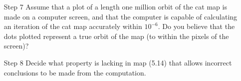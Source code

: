 \documentclass[12pt,letterpaper,reqno]{amsart}
\begin{document}
\begin{enumerate}
\begin{enumerate}
\begin{flushleft}
    \end{flushleft}
    
    \item[Step 7] Assume that a plot of a length one million orbit of the cat map is made on a computer screen, and that the computer is capable of calculating an iteration of the cat map accurately within $10^{-6}$. Do you believe that the dots plotted represent a true orbit of the map (to within the pixels of the screen)?
    \begin{flushleft}
    
    \end{flushleft}
    
    \item[Step 8] Decide what property is lacking in map (5.14) that allows incorrect conclusions to be made from the computation.
    \begin{flushleft}
    
    \end{flushleft}
    
\end{enumerate}

\begin{flushleft}

\end{flushleft}

\end{enumerate}
\end{document}
